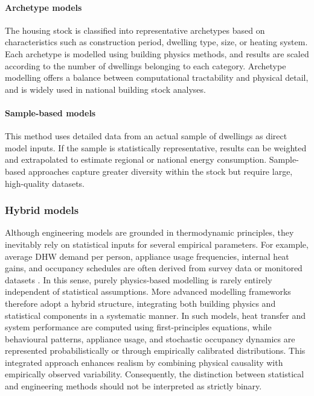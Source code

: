 \paragraph{Archetype models}
The housing stock is classified into representative archetypes based on characteristics such as construction period, dwelling type, size, or heating system. Each archetype is modelled using building physics methods, and results are scaled according to the number of dwellings belonging to each category. Archetype modelling offers a balance between computational tractability and physical detail, and is widely used in national building stock analyses.
\paragraph{Sample-based models}
This method uses detailed data from an actual sample of dwellings as direct model inputs. If the sample is statistically representative, results can be weighted and extrapolated to estimate regional or national energy consumption. Sample-based approaches capture greater diversity within the stock but require large, high-quality datasets.


\subsubsection*{Hybrid models}
Although engineering models are grounded in thermodynamic principles, they inevitably rely on statistical inputs for several empirical parameters. For example, average DHW demand per person, appliance usage frequencies, internal heat gains, and occupancy schedules are often derived from survey data or monitored datasets \cite{kavgicReviewBottomupBuilding2010}. In this sense, purely physics-based modelling is rarely entirely independent of statistical assumptions.
\newline More advanced modelling frameworks therefore adopt a hybrid structure, integrating both building physics and statistical components in a systematic manner. In such models, heat transfer and system performance are computed using first-principles equations, while behavioural patterns, appliance usage, and stochastic occupancy dynamics are represented probabilistically or through empirically calibrated distributions. This integrated approach enhances realism by combining physical causality with empirically observed variability. Consequently, the distinction between statistical and engineering methods should not be interpreted as strictly binary.


